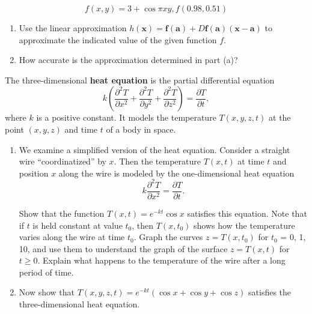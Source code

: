 \documentclass[12pt,letterpaper]{hmcpset}
\newcommand{\vb}{\mathbf}
\begin{document}
\begin{problem}[Colley 2.3.44]
  \[ f(x,y) = 3 + \cos \pi xy, f(0.98, 0.51)\]
  \begin{enumerate}[label=(\alph*)]
  \item Use the linear approximation $h(\vb x) = \vb f(\vb a) + D\vb f(\vb a)(\vb x - \vb a)$ to approximate the indicated value of the given function $f$.
  \item How accurate is the approximation determined in part (a)?
  \end{enumerate}
\end{problem}
\clearpage
\begin{problem}[Colley 2.4.29(a),(c)]
  The three-dimensional \textbf{heat equation} is the partial differential equation
  \[ k\left( \frac{\partial^2T}{\partial x^2} + \frac{\partial^2T}{\partial y^2} + \frac{\partial^2T}{\partial z^2}\right) = \frac{\partial T}{\partial t}, \]
  where $k$ is a positive constant.
  It models the temperature $T(x, y, z, t)$ at the point $(x, y, z)$ and time $t$ of a
  body in space.
  \begin{enumerate}[label=(\alph*)]
  \item \addtocounter{enumi}{1} We examine a simplified version of the heat equation.
    Consider a straight wire ``coordinatized'' by $x$.
    Then the temperature $T(x, t)$ at time $t$ and position $x$ along the wire is modeled by the one-dimensional heat equation
    \[ k \frac{\partial^2T}{\partial x^2} = \frac{\partial T}{\partial t}.\]

    Show that the function $T(x, t) = e^{-kt} \cos x$ satisfies this equation.
    Note that if $t$ is held constant at value $t_0$, then $T(x, t_0)$ shows how the temperature varies along the wire at time $t_0$.
    Graph the curves $z = T(x, t_0)$ for $t_0$ = 0, 1, 10, and use them to understand the graph of the surface $z = T (x, t)$ for
    $t \geq 0$.
    Explain what happens to the temperature of
the wire after a long period of time.
\item Now show that $T(x, y, z, t)=e^{-kt} (\cos x +
\cos y + \cos z)$ satisfies the three-dimensional heat
equation.
  \end{enumerate}
\end{problem}
\end{document}
